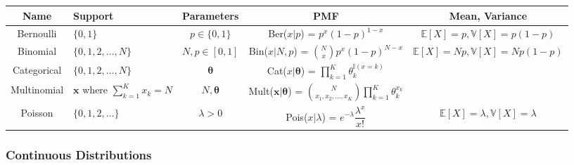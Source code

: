 \documentclass{article}
\begin{document}
\begin{center}
\begin{tabularx}{\textwidth}{c X c c c}
    \toprule
    \textbf{Name} & \textbf{Support} & \textbf{Parameters} & \textbf{PMF} & \textbf{Mean, Variance} \\
    \midrule
    Bernoulli & \(\{0, 1\}\) & \(p \in \{0, 1\}\) & Ber(\(x|p\)) = \(p^x (1-p)^{1-x}\) & \(\mathbb{E}[X] = p, \mathbb{V}[X] = p(1-p)\) \\
    \midrule
    Binomial & \(\{0, 1, 2, \ldots, N\}\) & \(N, p \in [0,1]\) & Bin(\(x|N,p\)) = \(\binom{N}{x} p^x (1-p)^{N-x}\) & \(\mathbb{E}[X] = Np, \mathbb{V}[X] = Np(1-p)\) \\
    \midrule
    Categorical & \(\{0, 1, 2, \ldots, N\}\) & \(\boldsymbol{\theta}\) & Cat(\(x|\boldsymbol{\theta}\)) = \(\prod_{k=1}^{K}\theta_{k}^{\mathbb{I}(x=k)}\) \\
    \midrule
    Multinomial & \(\bm{x}\) where \(\sum_{k = 1}^{K} x_k = N\) & \(N, \boldsymbol{\theta}\) & Mult(\(\bm{x}|\boldsymbol{\theta}\)) = \(\binom{N}{x_1, x_2, \ldots, x_K}\prod_{k = 1}^{K}\theta_{k}^{x_k}\) \\
    \midrule
    Poisson & \(\{0, 1, 2, \ldots\}\) & \(\lambda > 0\) & Pois(\(x|\lambda\)) = \(e^{-\lambda}\dfrac{\lambda^x}{x!}\) & \(\mathbb{E}[X] = \lambda, \mathbb{V}[X] = \lambda\) \\
    \bottomrule
\end{tabularx}
\end{center}


\subsubsection{Continuous Distributions}
\end{document}
